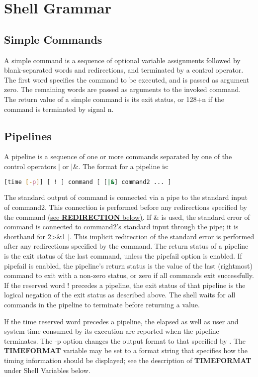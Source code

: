 \section{Shell Grammar}\label{sec:shellgrammar}
\subsection{Simple Commands}

A simple command is a sequence of optional variable assignments followed by blank-separated words and redirections, and terminated by a control operator. The first word specifies the command to be executed, and is passed as argument zero. The remaining words are passed as arguments to the invoked command.
The return value of a simple command is its exit status, or 128+n if the command is terminated by signal n.

\subsection{Pipelines}

A pipeline is a sequence of one or more commands separated by one of the control operators | or |\&. The format for a pipeline is:
\begin{lstlisting}[language=bash]
  [time [-p]] [ ! ] command [ [|&] command2 ... ]
\end{lstlisting}
The standard output of command is connected via a pipe to the standard input of command2. This connection is performed before any redirections specified by the command \hyperref[sec:redirection]{(see \textbf{REDIRECTION} below)}. If \& is used, the standard error of command is connected to command2's standard input through the pipe; it is shorthand for 2>\&1 |. This implicit redirection of the standard error is performed after any redirections specified by the command.
The return status of a pipeline is the exit status of the last command, unless the pipefail option is enabled. If pipefail is enabled, the pipeline's return status is the value of the last (rightmost) command to exit with a non-zero status, or zero if all commands exit successfully. If the reserved word ! precedes a pipeline, the exit status of that pipeline is the logical negation of the exit status as described above. The shell waits for all commands in the pipeline to terminate before returning a value.

If the time reserved word precedes a pipeline, the elapsed as well as user and system time consumed by its execution are reported when the pipeline terminates. The -p option changes the output format to that specified by . The \textbf{TIMEFORMAT} variable may be set to a format string that specifies how the timing information should be displayed; see the description of \textbf{TIMEFORMAT} under Shell Variables below.

